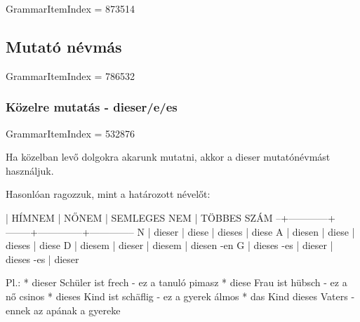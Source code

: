 \documentclass{article}
\newenvironment{desc}{\verbatim}{\endverbatim}
\newenvironment{exmp}{\verbatim}{\endverbatim}
\begin{document}
GrammarItemIndex = 873514

\begin{desc}
\end{desc}

\begin{exmp}
\end{exmp}

\subsection{Mutató névmás}

GrammarItemIndex = 786532

\begin{desc}
\end{desc}

\begin{exmp}
\end{exmp}

\subsubsection{Közelre mutatás - dieser/e/es}

GrammarItemIndex = 532876

\begin{desc}
Ha közelban levő dolgokra akarunk mutatni, akkor a dieser mutatónévmást használjuk.

Hasonlóan ragozzuk, mint a határozott névelőt:

  | HÍMNEM     | NŐNEM  | SEMLEGES NEM | TÖBBES SZÁM
--+------------+--------+--------------+--------------
N | dieser     | diese  | dieses       | diese
A | diesen     | diese  | dieses       | diese
D | diesem     | dieser | diesem       | diesen -en
G | dieses -es | dieser | dieses -es   | dieser

Pl.: * dieser Schüler ist frech - ez a tanuló pimasz
* diese Frau ist hübsch - ez a nő csinos
* dieses Kind ist schäflig - ez a gyerek álmos
* das Kind dieses Vaters - ennek az apának a gyereke
\end{desc}
\end{document}
